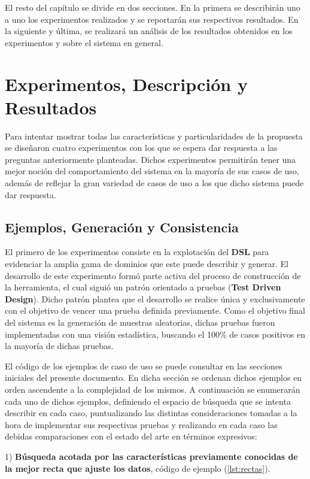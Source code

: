El resto del capítulo se divide en dos secciones. En la primera se describirán uno a uno los
experimentos realizados y se reportarán sus respectivos resultados. En la siguiente y última,
se realizará un análisis de los resultados obtenidos en los experimentos
y sobre el sistema en general.

\section{Experimentos, Descripción y Resultados}

Para intentar mostrar todas las características y particularidades de la propuesta se diseñaron
cuatro experimentos con los que se espera dar respuesta a las preguntas anteriormente planteadas. 
Dichos experimentos permitirán tener una mejor noción del
comportamiento del sistema en la mayoría de sus casos de uso, además de reflejar la gran variedad de
casos de uso a los que dicho sistema puede dar respuesta.

\subsection{Ejemplos, Generación y Consistencia}

El primero de los experimentos consiste en la explotación del {\bf DSL} para evidenciar la
amplia gama de dominios que este puede describir y generar. El desarrollo de este experimento
formó parte activa del proceso de construcción de la herramienta, el cual siguió un patrón orientado a pruebas ({\bf Test
            Driven Design}). Dicho patrón plantea que el desarrollo se realice única y exclusivamente con el
objetivo de vencer una prueba definida previamente. Como el objetivo final del sistema es la
generación de muestras aleatorias, dichas pruebas fueron implementadas con una visión estadística,
buscando el 100\% de casos positivos en la mayoría de dichas pruebas.

El código de los ejemplos de caso de uso se puede consultar en las secciones iniciales del presente
documento. En dicha sección se ordenan dichos ejemplos en orden ascendente a la complejidad de los
mismos. A continuación se enumerarán cada uno de dichos ejemplos, definiendo el espacio de búsqueda
que se intenta describir en cada caso, puntualizando las distintas consideraciones tomadas a la hora
de implementar sus respectivas pruebas y realizando en cada caso las debidas comparaciones con el
estado del arte en términos expresivos:

1) {\bf Búsqueda acotada por las características previamente conocidas de la mejor recta que ajuste los
            datos}, código de ejemplo (\ref{lst:rectas}). 

